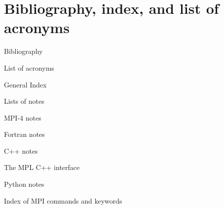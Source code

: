 \documentclass[11pt,letterpaper,twoside,openany]{boek3}
\begin{document}



\part {Bibliography, index, and list of acronyms}

 {Bibliography}



\vfill\pagebreak

 {List of acronyms}

\def\acitem#1#2{\item[#1] #2}
\def\acitemi#1#2#3{\item[#1]{#2}\index{#1|see{#3}}}

\begin{multicols}{2}
\begin{description}

\end{description}
\end{multicols}

 {General Index}


\printindex

 {Lists of notes}

 {MPI-4 notes}

\listofmpifournote

 {Fortran notes}

\listoffortrannote

 {C++ notes}

\listofcppnote

 {The MPL C++ interface}
\label{sec:idx:mpl}

\listofmplnote

 {Python notes}

\listofpythonnote

 {Index of MPI commands and keywords}

\begin{multicols*}{2}
\printindex[mpi]
\end{multicols*}
\end{document}
